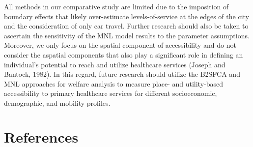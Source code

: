 \documentclass[]{elsarticle} %
\begin{document}
All methods in our comparative study are limited due to the imposition
of boundary effects that likely over-estimate levels-of-service at the
edges of the city and the consideration of only car travel. Further
research should also be taken to ascertain the sensitivity of the MNL
model results to the parameter assumptions. Moreover, we only focus on
the spatial component of accessibility and do not consider the aspatial
components that also play a significant role in defining an individual's
potential to reach and utilize healthcare services (Joseph and Bantock,
1982). In this regard, future research should utilize the B2SFCA and MNL
approaches for welfare analysis to measure place- and utility-based
accessibility to primary healthcare services for different
socioeconomic, demographic, and mobility profiles.

\hypertarget{references}{%
\section*{References}\label{references}}
\end{document}
